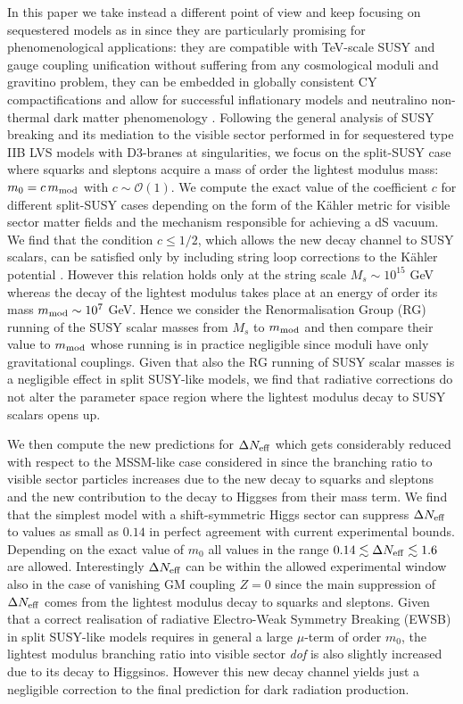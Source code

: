 \documentclass[11pt,a4paper]{article}
\newcommand{\mc}{\mathcal}
\begin{document}
In this paper we take instead a different point of view and keep focusing on sequestered models as in \cite{DR1, DR2} since they are particularly promising for phenomenological applications: they are compatible with TeV-scale SUSY and gauge coupling unification without suffering from any cosmological moduli and gravitino problem, they can be embedded in globally consistent CY compactifications \cite{CYembedding} and allow for successful inflationary models \cite{KMI} and neutralino non-thermal dark matter phenomenology \cite{Aparicio:2015sda}. Following the general analysis of SUSY breaking and its mediation to the visible sector performed in \cite{SoftTermsSeqLVS} for sequestered type IIB LVS models with D3-branes at singularities, we focus on the split-SUSY case where squarks and sleptons acquire a mass of order the lightest modulus mass: $m_0 = c\, m_{\rm mod}$ with $c\sim \mc{O}(1)$. We compute the exact value of the coefficient $c$ for different split-SUSY cases depending on the form of the K\"ahler metric for visible sector matter fields and the mechanism responsible for achieving a dS vacuum. We find that the condition $c\leq 1/2$, which allows the new decay channel to SUSY scalars, can be satisfied only by including string loop corrections to the K\"ahler potential \cite{Berg:2007wt, extendednoscale}. However this relation holds only at the string scale $M_s \sim 10^{15}$ GeV whereas the decay of the lightest modulus takes place at an energy of order its mass $m_{\rm mod}\sim 10^7$ GeV. Hence we consider the Renormalisation Group (RG) running of the SUSY scalar masses from $M_s$ to $m_{\rm mod}$ and then compare their value to $m_{\rm mod}$ whose running is in practice negligible since moduli have only gravitational couplings. Given that also the RG running of SUSY scalar masses is a negligible effect in split SUSY-like models, we find that radiative corrections do not alter the parameter space region where the lightest modulus decay to SUSY scalars opens up. 

We then compute the new predictions for $\Delta N_{\rm eff}$ which gets considerably reduced with respect to the MSSM-like case considered in \cite{DR1, DR2} since the branching ratio to visible sector particles increases due to the new decay to squarks and sleptons and the new contribution to the decay to Higgses from their mass term. We find that the simplest model with a shift-symmetric Higgs sector can suppress $\Delta N_{\rm eff}$ to values as small as $0.14$ in perfect agreement with current experimental bounds. Depending on the exact value of $m_0$ all values in the range $0.14 \lesssim \Delta N_{\rm eff} \lesssim 1.6$ are allowed. Interestingly $\Delta N_{\rm eff}$ can be within the allowed experimental window also in the case of vanishing GM coupling $Z = 0$ since the main suppression of $\Delta N_{\rm eff}$ comes from the lightest modulus decay to squarks and sleptons. Given that a correct realisation of radiative Electro-Weak Symmetry Breaking (EWSB) in split SUSY-like models requires in general a large $\mu$-term of order $m_0$, the lightest modulus branching ratio into visible sector \textit{dof} is also slightly increased due to its decay to Higgsinos. However this new decay channel yields just a negligible correction to the final prediction for dark radiation production. 
\end{document}
